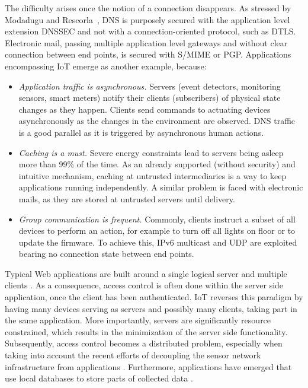 \documentclass[conference]{IEEEtran}
\begin{document}
The difficulty arises once the notion of a connection disappears. As stressed by
Modadugu and Rescorla~\cite{dtls}, DNS is purposely secured with the application
level extension DNSSEC and not with a connection-oriented protocol, such as DTLS.  Electronic mail, passing multiple application level gateways and without clear connection between end points, is secured with S/MIME or PGP. Applications encompassing IoT emerge as another example, because:
 
 \begin{itemize}
 \item \textit{Application traffic is asynchronous.} Servers (event detectors, monitoring sensors, smart meters) notify their clients (subscribers) of physical state changes as they happen. Clients send commands to actuating devices asynchronously as the changes in the environment are observed. DNS traffic is a good parallel as it is triggered by  asynchronous human actions. 
 \item \textit{Caching is a must.} Severe energy constraints lead to servers
   being asleep more than 99\% of the time. As an already supported (without
   security) and intuitive mechanism, caching at untrusted intermediaries is a
   way to keep applications running independently. A similar problem is faced with electronic mails, as they are stored at untrusted servers until delivery.
 \item \textit{Group communication is frequent.} Commonly, clients instruct a subset of all devices to perform an action, for example to turn off all lights on  floor or to update the firmware. To achieve this, IPv6 multicast and UDP are exploited bearing no connection state between end points.
\end{itemize}

Typical Web applications are built around a single logical server and multiple
clients \cite{rest}. As a consequence, access control is often done within the server side application, once the client has been authenticated. IoT reverses this paradigm by having many devices serving as servers and
possibly many clients, taking part in the same application. More importantly,
servers are significantly resource constrained, which results in the
minimization of the server side functionality. Subsequently, access control
becomes a distributed problem, especially when taking into account the recent efforts of decoupling the sensor network infrastructure from applications \cite{senshare, m2m-metering}. Furthermore, applications have emerged that use local databases to store parts of collected data \cite{database}.
 
\end{document}
